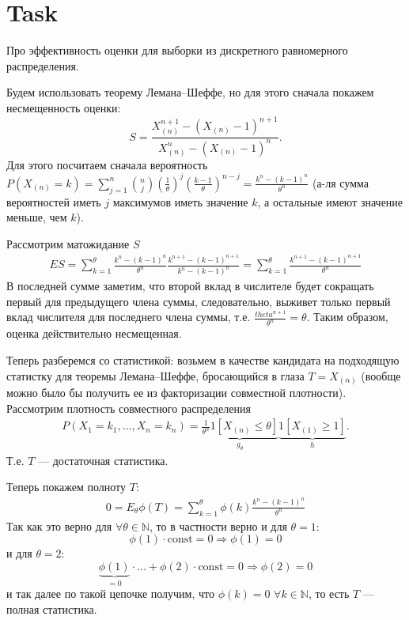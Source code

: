 \section{Task}
\begin{task}
    Про эффективность оценки для выборки из дискретного равномерного распределения.
\end{task}

\begin{solution}
    Будем использовать теорему Лемана--Шеффе, но для этого сначала покажем несмещенность оценки:
    \begin{equation}
        S = \frac{X^{n + 1}_{(n)} - (X_{(n)} - 1)^{n + 1}}{X^{n}_{(n)} - (X_{(n)} - 1)^{n}}.
    \end{equation}
    Для этого посчитаем сначала вероятность $P(X_{(n)} = k) = \sum\limits_{j=1}^{n}{n \choose j}(\frac{1}{\theta})^j(\frac{k - 1}{\theta})^{n - j} = \frac{k^n - (k - 1)^n}{\theta^n}$ (а-ля сумма вероятностей иметь $j$ максимумов иметь значение $k$, а остальные имеют значение меньше, чем $k$).

    Рассмотрим матожидание $S$
    \begin{gather}
        ES = \sum\limits_{k = 1}^{\theta}\frac{k^n - (k - 1)^{n}}{\theta^n}\frac{k^{n+1} - (k-1)^{n+1}}{k^n - (k - 1)^{n}} = \sum\limits_{k = 1}^{\theta}\frac{k^{n+1} - (k - 1)^{n + 1}}{\theta^n}
    \end{gather}
    В последней сумме заметим, что второй вклад в числителе будет сокращать первый для предыдущего члена суммы, следовательно, выживет только первый вклад числителя для последнего члена суммы, т.е. $\frac{theta^{n + 1}}{\theta^n} = \theta$.
    Таким образом, оценка действительно несмещенная.

    Теперь разберемся со статистикой: возьмем в качестве кандидата на подходящую статистку для теоремы Лемана--Шеффе, бросающийся в глаза $T = X_{(n)}$ (вообще можно было бы получить ее из факторизации совместной плотности).
    Рассмотрим плотность совместного распределения 
    \begin{gather}
        P(X_1= k_1, \ldots, X_n = k_n) = \underbrace{\frac{1}{\theta^n}1[X_{(n)} \leq \theta]}_{g_{\theta}} \underbrace{1[X_{(1)} \geq 1]}_{h}.
    \end{gather}
    Т.е. $T$ --- достаточная статистика.

    Теперь покажем полноту $T$:
    \begin{gather}
        0 = E_{\theta}\phi(T) = \sum\limits_{k = 1}^{\theta}\phi(k)\frac{k^n - (k - 1)^n}{\theta^n}
    \end{gather}
    Так как это верно для $\forall \theta \in \mathbb{N}$, то в частности верно и для $\theta = 1$:
    \begin{equation}
        \phi(1) \cdot \text{const} = 0 \Longrightarrow \phi(1) = 0
    \end{equation}
    и для $\theta = 2$:
    \begin{equation}
        \underbrace{\phi(1)}_{=0}\cdot\ldots + \phi(2)\cdot\text{const} = 0 \Longrightarrow \phi(2) = 0
    \end{equation}
    и так далее по такой цепочке получим, что $\phi(k) = 0$ $\forall k \in \mathbb{N}$, то есть $T$ --- полная статистика.


\end{solution}
